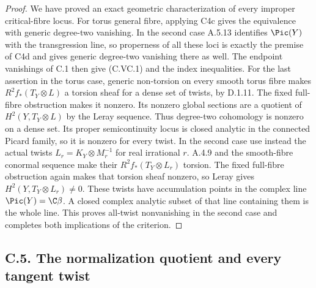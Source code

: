 \begin{proof}
We have proved an exact geometric characterization of
every improper critical-fibre locus. For torus general
fibre, applying C4c gives the equivalence with generic
degree-two vanishing. In the second case A.5.13 identifies
$\Pic(Y)$ with the transgression line, so properness of
all these loci is exactly the premise of C4d and gives
generic degree-two vanishing there as well.
The endpoint vanishings of C.1 then give (C.VC.1) and the
index inequalities.
For the last assertion in the torus case, generic non-torsion on every
smooth torus fibre makes $R^2f_*(T_Y\otimes L)$ a
torsion sheaf for a dense set of twists, by D.1.11.
The fixed full-fibre obstruction makes it nonzero.
Its nonzero global sections are a quotient of
$H^2(Y,T_Y\otimes L)$ by the Leray sequence.
Thus degree-two cohomology is nonzero on a dense set.
Its proper semicontinuity locus is closed analytic in
the connected Picard family, so it is nonzero for every
twist. In the second case use instead the actual twists
$L_r=K_Y\otimes M_r^{-1}$ for real irrational $r$.
A.4.9 and the smooth-fibre conormal sequence make their
$R^2f_*(T_Y\otimes L_r)$ torsion. The fixed full-fibre
obstruction again makes that torsion sheaf nonzero,
so Leray gives $H^2(Y,T_Y\otimes L_r)\ne0$.
These twists have accumulation points in the complex
line $\Pic(Y)=\C\beta$. A closed complex analytic subset
of that line containing them is the whole line.
This proves all-twist nonvanishing in the second case
and completes both implications of the criterion.
\end{proof}


\subsection{C.5. The normalization quotient and every tangent twist}


